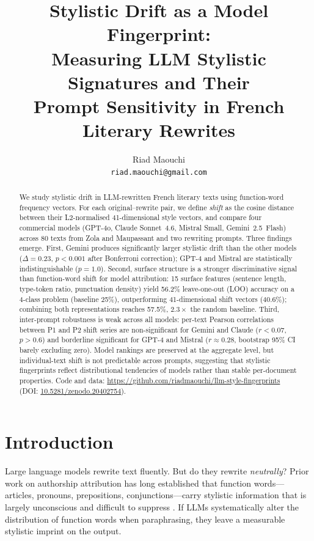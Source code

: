 \documentclass[11pt,a4paper]{article}
\title{Stylistic Drift as a Model Fingerprint:\\
Measuring LLM Stylistic Signatures and Their\\
Prompt Sensitivity in French Literary Rewrites}
\author{
  Riad Maouchi \\
  \texttt{riad.maouchi@gmail.com}
}
\begin{document}
\maketitle

\begin{abstract}
We study stylistic drift in LLM-rewritten French literary texts using
function-word frequency vectors.
For each original--rewrite pair, we define \emph{shift} as the cosine
distance between their L2-normalised 41-dimensional style vectors, and
compare four commercial models (GPT-4o, Claude Sonnet~4.6,
Mistral Small, Gemini~2.5~Flash) across 80 texts from Zola and Maupassant
and two rewriting prompts.
Three findings emerge.
First, Gemini produces significantly larger stylistic drift than the other
models ($\Delta = 0.23$, $p < 0.001$ after Bonferroni correction);
GPT-4 and Mistral are statistically indistinguishable ($p = 1.0$).
Second, surface structure is a stronger discriminative signal than
function-word shift for model attribution: 15 surface features (sentence
length, type-token ratio, punctuation density) yield 56.2\% leave-one-out
(LOO) accuracy on a 4-class problem (baseline 25\%), outperforming
41-dimensional shift vectors (40.6\%); combining both representations
reaches 57.5\%, $2.3\times$ the random baseline.
Third, inter-prompt robustness is weak across all models:
per-text Pearson correlations between P1 and P2 shift series are
non-significant for Gemini and Claude ($r < 0.07$, $p > 0.6$) and
borderline significant for GPT-4 and Mistral ($r \approx 0.28$,
bootstrap 95\% CI barely excluding zero).
Model rankings are preserved at the aggregate level,
but individual-text shift is not predictable across prompts,
suggesting that stylistic fingerprints reflect distributional tendencies
of models rather than stable per-document properties.
Code and data: \url{https://github.com/riadmaouchi/llm-style-fingerprints} (DOI: \href{https://doi.org/10.5281/zenodo.20402754}{10.5281/zenodo.20402754}).
\end{abstract}

\section{Introduction}

Large language models rewrite text fluently.
But do they rewrite \emph{neutrally}?
Prior work on authorship attribution has long established that
function words---articles, pronouns, prepositions, conjunctions---carry
stylistic information that is largely unconscious and difficult to suppress
\citep{mosteller1964,burrows1987,juola2015}.
If LLMs systematically alter the distribution of function words when
paraphrasing, they leave a measurable stylistic imprint on the output.
\end{document}
